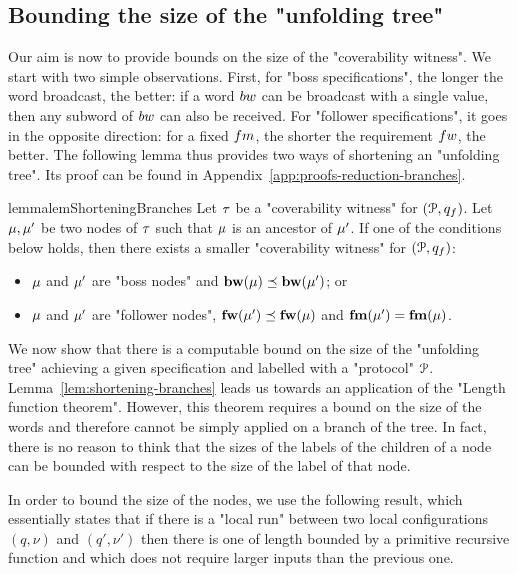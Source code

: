 \subsection{Bounding the size of the "unfolding tree"}
\label{sec:tree-bounds}

Our aim is now to provide bounds on the size of the "coverability witness". We start with two simple observations. First, for "boss specifications", the longer the word broadcast, the better: if a word $\bossspec$ can be broadcast with a single value, then any subword of $\bossspec$ can also be received. 
For "follower specifications", it goes in the opposite direction: for a fixed $\followmessagespec$, the shorter the requirement $\followwordspec$, the better. The following lemma thus provides two ways of shortening an "unfolding tree". Its proof can be found in Appendix~\ref{app:proofs-reduction-branches}.

\begin{restatable}{lemma}{lemShorteningBranches} 
\label{lem:shortening-branches}
	Let $\tau$ be a "coverability witness" for $(\mathcal{P}, q_f)$.
	Let $\mu, \mu'$ be two nodes of $\tau$ such that $\mu$ is an ancestor of $\mu'$. If one of the conditions below holds, then there exists a smaller "coverability witness" for $(\mathcal{P}, q_f)$:
	\begin{itemize}
	\item $\mu$ and $\mu'$ are "boss nodes" and $\mathbf{bw}(\mu) \preceq \mathbf{bw}(\mu')$; or
	\item $\mu$ and $\mu'$ are "follower nodes", $\mathbf{fw}(\mu') \preceq \mathbf{fw}(\mu)$ and $\mathbf{fm}(\mu')=\mathbf{fm}(\mu)$.
	\end{itemize} 
\end{restatable}


We now show that there is a computable bound on the size of the "unfolding tree" achieving a given specification and labelled with a "protocol" $\mathcal{P}$. Lemma~\ref{lem:shortening-branches} leads us towards an application of the "Length function theorem". 
However, this theorem requires a bound on the size of the words and therefore cannot be simply applied on a branch of the tree. In fact, there is no reason to think that the sizes of the labels of the children of a node can be bounded with respect to the size of the label of that node. 

In order to bound the size of the nodes, we use the following result, which essentially states that if there is a "local run" between two local configurations $(q, \nu)$ and $(q', \nu')$ then there is one of length bounded by a primitive recursive function and which does not require larger inputs than the previous one.

